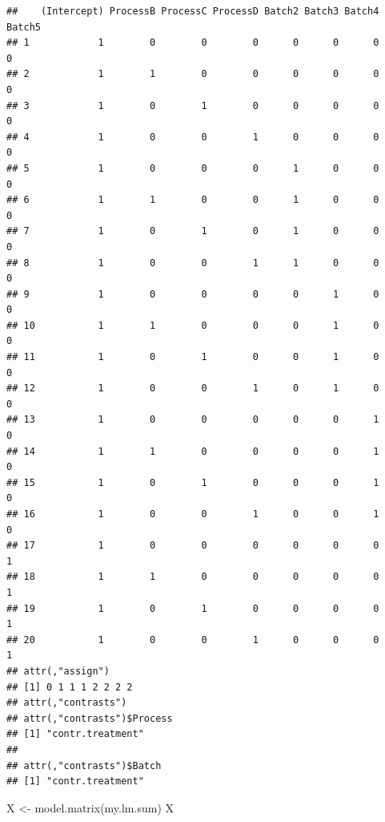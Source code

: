\documentclass[
]{book}
\newenvironment{Shaded}{\begin{snugshade}}{\end{snugshade}}
\newcommand{\FunctionTok}[1]{\textcolor[rgb]{0.00,0.00,0.00}{#1}}
\newcommand{\NormalTok}[1]{#1}
\newcommand{\OtherTok}[1]{\textcolor[rgb]{0.56,0.35,0.01}{#1}}
\begin{document}
\begin{verbatim}
##    (Intercept) ProcessB ProcessC ProcessD Batch2 Batch3 Batch4 Batch5
## 1            1        0        0        0      0      0      0      0
## 2            1        1        0        0      0      0      0      0
## 3            1        0        1        0      0      0      0      0
## 4            1        0        0        1      0      0      0      0
## 5            1        0        0        0      1      0      0      0
## 6            1        1        0        0      1      0      0      0
## 7            1        0        1        0      1      0      0      0
## 8            1        0        0        1      1      0      0      0
## 9            1        0        0        0      0      1      0      0
## 10           1        1        0        0      0      1      0      0
## 11           1        0        1        0      0      1      0      0
## 12           1        0        0        1      0      1      0      0
## 13           1        0        0        0      0      0      1      0
## 14           1        1        0        0      0      0      1      0
## 15           1        0        1        0      0      0      1      0
## 16           1        0        0        1      0      0      1      0
## 17           1        0        0        0      0      0      0      1
## 18           1        1        0        0      0      0      0      1
## 19           1        0        1        0      0      0      0      1
## 20           1        0        0        1      0      0      0      1
## attr(,"assign")
## [1] 0 1 1 1 2 2 2 2
## attr(,"contrasts")
## attr(,"contrasts")$Process
## [1] "contr.treatment"
## 
## attr(,"contrasts")$Batch
## [1] "contr.treatment"
\end{verbatim}

\begin{Shaded}
\begin{Highlighting}[]
\NormalTok{X }\OtherTok{\textless{}{-}} \FunctionTok{model.matrix}\NormalTok{(my.lm.sum)}
\NormalTok{X}
\end{Highlighting}
\end{Shaded}
\end{document}
